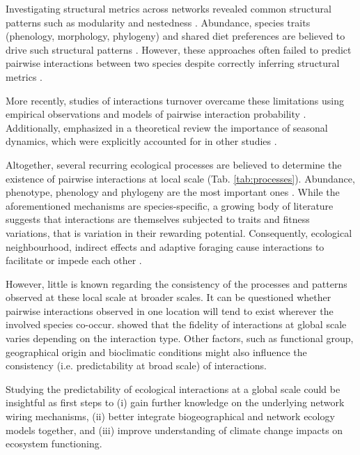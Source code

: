 \documentclass[12pt]{article}
\begin{document}
Investigating structural metrics across networks revealed common structural patterns such as modularity and nestedness \citep{Jordano2003,Bascompte2003,Gonzalez-Castro2012}.
Abundance, species traits (phenology, morphology, phylogeny) and shared diet preferences are believed to drive such structural patterns \citep{Rohr2014,Hutchinson2017,Pires2011,Vazquez2009a,Poisot2015,Jordano2016}.
However, these approaches often failed to predict pairwise interactions between two species despite correctly inferring structural metrics \citep{Vazquez2009a,Olito2015}.

More recently, studies of interactions turnover overcame these limitations using empirical observations and models of pairwise interaction probability \citep{Burkle2013,Rominger2016,Donoso2017,Guimaraes2017,Tylianakis2018,Pires2020}.
Additionally, \citet{Bascompte2009} emphasized in a theoretical review the importance of seasonal dynamics, which were explicitly accounted for in other studies \citep{Valdovinos2013,Garcia2014,BramonMora2020}.

Altogether, several recurring ecological processes are believed to determine the existence of pairwise interactions at local scale (Tab. \ref{tab:processes}).
Abundance, phenotype, phenology and phylogeny are the most important ones \citep{Vazquez2009}.
While the aforementioned mechanisms are species-specific, a growing body of literature suggests that interactions are themselves subjected to traits and fitness variations, that is variation in their rewarding potential.
Consequently, ecological neighbourhood, indirect effects and adaptive foraging cause interactions to facilitate or impede each other \citep{Aizen2012,Donoso2017,Levine2017}.

However, little is known regarding the consistency of the processes and patterns observed at these local scale at broader scales.
It can be questioned whether pairwise interactions observed in one location will tend to exist wherever the involved species co-occur.
\citet{Fortuna2020} showed that the fidelity of interactions at global scale varies depending on the interaction type.
Other factors, such as functional group, geographical origin and bioclimatic conditions might also influence the consistency (i.e. predictability at broad scale) of interactions.

Studying the predictability of ecological interactions at a global scale could be insightful as first steps to (i) gain further knowledge on the underlying network wiring mechanisms, (ii) better integrate biogeographical and network ecology models together, and (iii) improve understanding of climate change impacts on ecosystem functioning.
\end{document}
